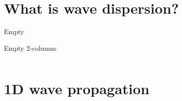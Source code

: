 \documentclass[10pt,aspectratio=169,notes]{beamer} %
\begin{document}
\section{What is wave dispersion?}
\begin{frame}{Empty}

\end{frame}
\note{
}
\begin{frame}{Empty 2-columns}
\begin{columns}[T]
	\begin{column}{0.5\textwidth}
		
	\end{column}
	\begin{column}{0.5\textwidth}
			
	\end{column}
\end{columns}		
\end{frame}
\note{
}
\section{1D wave propagation}
\end{document}

